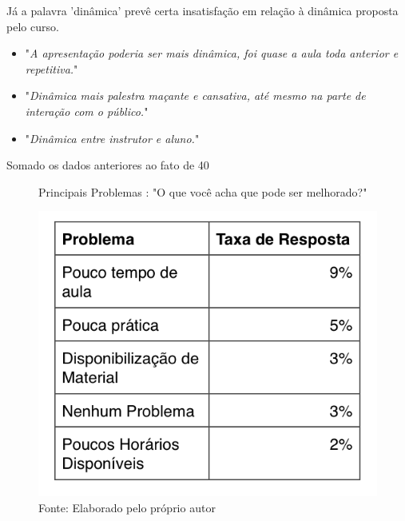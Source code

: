 Já a palavra 'dinâmica' prevê certa insatisfação em relação à dinâmica proposta pelo curso.

\begin{itemize}
\item "\textit{A apresentação poderia ser mais dinâmica, foi quase a aula toda anterior e repetitiva.}"
\item "\textit{Dinâmica mais palestra maçante e cansativa, até mesmo na parte de interação com o público.}"
\item "\textit{Dinâmica entre instrutor e aluno.}"
\end{itemize}

Somado os dados anteriores ao fato de 40%

\begin{figure}[H]
\caption{Principais Problemas : "O que você acha que pode ser melhorado?"}
\centerline{\includegraphics[scale=0.75]{img/melhoriasfinaltable}}
\label{fig:melhoriasfinaltable}
\caption* {Fonte: Elaborado pelo próprio autor}
\end{figure}


